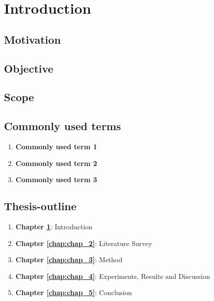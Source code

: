 \section{Introduction}\label{chap:chap_1}


\subsection{Motivation}



\subsection{Objective}



\subsection{Scope}



\subsection{Commonly used terms}

\begin{enumerate}
	\item \textbf{Commonly used term 1}
	
	\item \textbf{Commonly used term 2}
	
	\item \textbf{Commonly used term 3}
\end{enumerate}


\subsection{Thesis-outline}

\begin{enumerate}[label=\Roman*]
	\item {\color{red} \textbf{Chapter \ref{chap:chap_1}}}: Introduction\\
	
	\item {\color{red} \textbf{Chapter \ref{chap:chap_2}}}: Literature Survey\\
	
	\item {\color{red} \textbf{Chapter \ref{chap:chap_3}}}: Method\\
	 
	\item {\color{red} \textbf{Chapter \ref{chap:chap_4}}}: Experiments, Results and Discussion\\
	
	\item {\color{red} \textbf{Chapter \ref{chap:chap_5}}}: Conclusion\\
    
\end{enumerate}
